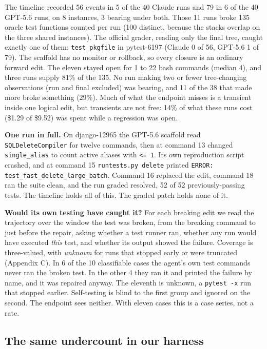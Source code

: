 \documentclass{article}
\begin{document}
The timeline recorded 56 events in 5 of the 40 Claude runs and 79 in 6 of the 40 GPT-5.6 runs, on 8 instances, 3 bearing under both. Those 11 runs broke 135 oracle test functions counted per run (100 distinct, because the stacks overlap on the three shared instances). The official grader, reading only the final tree, caught exactly one of them: \texttt{test\_pkgfile} in pytest-6197 (Claude 0 of 56, GPT-5.6 1 of 79). The scaffold has no monitor or rollback, so every closure is an ordinary forward edit. The eleven stayed open for 1 to 22 bash commands (median 4), and three runs supply 81\% of the 135. No run making two or fewer tree-changing observations (run and final excluded) was bearing, and 11 of the 38 that made more broke something (29\%). Much of what the endpoint misses is a transient inside one logical edit, but transients are not free: 14\% of what these runs cost (\$1.29 of \$9.52) was spent while a regression was open.

\textbf{One run in full.} On django-12965 the GPT-5.6 scaffold read \texttt{SQLDeleteCompiler} for twelve commands, then at command 13 changed \texttt{single\_alias} to count active aliases with \texttt{<= 1}. Its own reproduction script crashed, and at command 15 \texttt{runtests.py delete} printed \texttt{ERROR: test\_fast\_delete\_large\_batch}. Command 16 replaced the edit, command 18 ran the suite clean, and the run graded resolved, 52 of 52 previously-passing tests. The timeline holds all of this. The graded patch holds none of it.

\textbf{Would its own testing have caught it?} For each breaking edit we read the trajectory over the window the test was broken, from the breaking command to just before the repair, asking whether a test runner ran, whether any run would have executed \emph{this} test, and whether its output showed the failure. Coverage is three-valued, with \emph{unknown} for runs that stopped early or were truncated (Appendix C). In 6 of the 10 classifiable cases the agent's own test commands never ran the broken test. In the other 4 they ran it and printed the failure by name, and it was repaired anyway. The eleventh is unknown, a \texttt{pytest -x} run that stopped earlier. Self-testing is blind to the first group and ignored on the second. The endpoint sees neither. With eleven cases this is a case series, not a rate.

\subsection{The same undercount in our harness}
\end{document}
